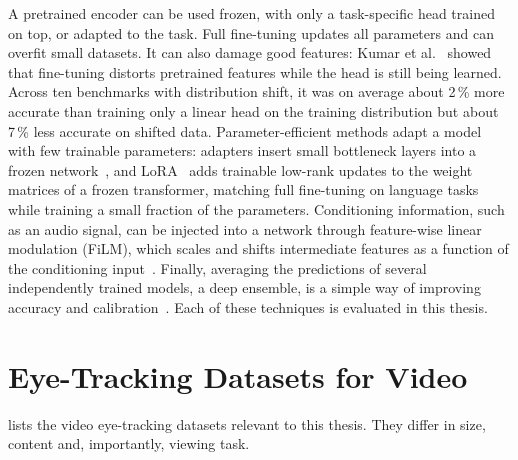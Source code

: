 A pretrained encoder can be used frozen, with only a task-specific head trained
on top, or adapted to the task. Full fine-tuning updates all parameters and can
overfit small datasets. It can also damage good features: Kumar et
al.~\cite{kumar2022fine} showed that fine-tuning distorts pretrained features
while the head is still being learned. Across ten benchmarks with distribution
shift, it was on average about 2\,\% more accurate than training only a linear
head on the training distribution but about 7\,\% less accurate on shifted data.
Parameter-efficient methods adapt a model with few trainable parameters:
adapters insert small bottleneck layers into a frozen
network~\cite{houlsby2019parameter}, and \acrshort{LoRA}~\cite{hu2022lora} adds trainable
low-rank updates to the weight matrices of a frozen transformer, matching full
fine-tuning on language tasks while training a small fraction of the
parameters. Conditioning information, such as an audio signal, can be injected
into a network through feature-wise linear modulation (\acrshort{FiLM}), which scales and
shifts intermediate features as a function of the conditioning
input~\cite{perez2018film}. Finally, averaging the predictions of several
independently trained models, a deep ensemble, is a simple way of improving
accuracy and calibration~\cite{lakshminarayanan2017simple}. Each of these
techniques is evaluated in this thesis.

\section{Eye-Tracking Datasets for Video}\label{sec:datasets}

 lists the video eye-tracking datasets relevant to this
thesis. They differ in size, content and, importantly, viewing task.

